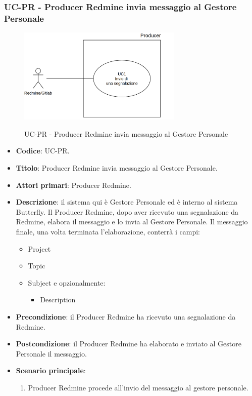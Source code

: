 \subsubsection{UC\theuccount-PR - Producer Redmine invia messaggio al Gestore Personale}
    \begin{figure}[H]
		\centering
		\includegraphics[width=0.7\textwidth]{img/UC1.png}\\
		\caption{UC\theuccount-PR - Producer Redmine invia messaggio al Gestore Personale}
	\end{figure}
	\begin{itemize}
		\item \textbf{Codice}: UC\theuccount-PR.
		\item \textbf{Titolo}: Producer Redmine invia messaggio al Gestore Personale.
		\item \textbf{Attori primari}: Producer Redmine.
		\item \textbf{Descrizione}:
		 il sistema qui è Gestore Personale ed è interno al sistema
		 Butterfly. Il Producer Redmine, dopo aver ricevuto una
		 segnalazione da Redmine, elabora il messaggio e lo invia al Gestore Personale.
		 Il messaggio finale, una volta terminata l'elaborazione, conterrà i campi:
		 \begin{itemize}
		 	\item Project
		 	\item Topic
		 	\item Subject e opzionalmente:
		 	\begin{itemize}
		 		\item Description
		 	\end{itemize}
		 \end{itemize}
		\item \textbf{Precondizione}: il Producer Redmine ha ricevuto una segnalazione da Redmine.
		\item \textbf{Postcondizione}: il Producer Redmine ha elaborato e inviato al Gestore Personale il messaggio.
		\item \textbf{Scenario principale}: 
		\begin{enumerate}
			\item Producer Redmine procede all'invio del messaggio al gestore personale.
		\end{enumerate}
		
	\end{itemize}

